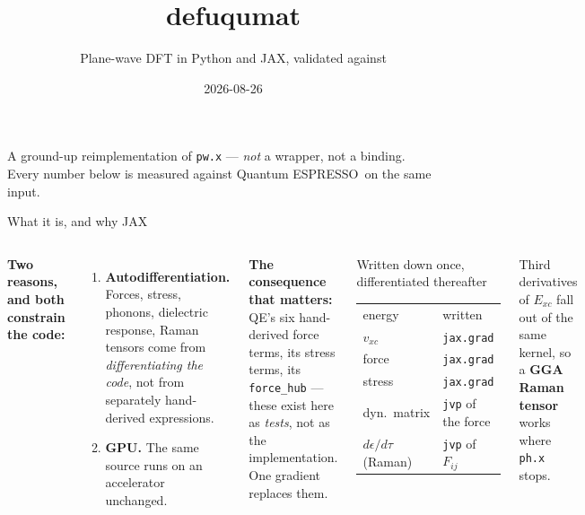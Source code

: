 \documentclass[aspectratio=169,10pt]{beamer}
\title{\textbf{defuqumat}}
\subtitle{Plane-wave DFT in Python and JAX, validated against \qe}
\date{2026-08-26}
\newcommand{\qe}{Quantum ESPRESSO}
\begin{document}
\begin{frame}\titlepage
\begin{center}\small
A ground-up reimplementation of \texttt{pw.x} --- \emph{not} a wrapper, not a binding.\\
Every number below is measured against \qe\ on the same input.
\end{center}
\end{frame}

\begin{frame}{What it is, and why JAX}
\begin{columns}[T]
\textbf{Two reasons, and both constrain the code:}
\begin{enumerate}
  \item \textbf{Autodifferentiation.} Forces, stress, phonons, dielectric
    response, Raman tensors come from \emph{differentiating the code}, not from
    separately hand-derived expressions.
  \item \textbf{GPU.} The same source runs on an accelerator unchanged.
\end{enumerate}
\vspace{4pt}
\textbf{The consequence that matters:}\\
QE's six hand-derived force terms, its stress terms, its \texttt{force\_hub} ---
these exist here as \emph{tests}, not as the implementation. One gradient
replaces them.
\footnotesize
\begin{block}{Written down once, differentiated thereafter}
\begin{tabular}{ll}
\toprule
energy & written \\
$v_{xc}$ & \texttt{jax.grad} \\
force & \texttt{jax.grad} \\
stress & \texttt{jax.grad} \\
dyn.\ matrix & \texttt{jvp} of the force \\
$d\epsilon/d\tau$ (Raman) & \texttt{jvp} of $F_{ij}$ \\
\bottomrule
\end{tabular}
\end{block}
Third derivatives of $E_{xc}$ fall out of the same kernel, so a \textbf{GGA
Raman tensor} works where \texttt{ph.x} stops.
\end{columns}
\end{frame}
\end{document}
